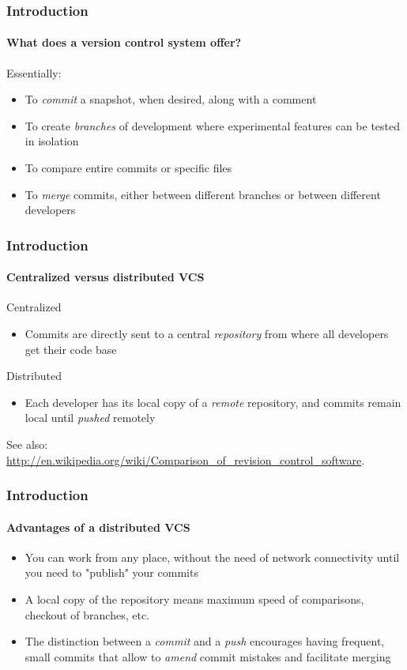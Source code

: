 \begin{frame}
\frametitle{Introduction}
\framesubtitle{What does a version control system offer?}

\begin{block}{Essentially:}
\begin{itemize}
\item To {\em commit} a snapshot, when desired, along with a comment 
\item To create {\em branches} of development where experimental features can be tested in isolation
\item To compare entire commits or specific files
\item To {\em merge} commits, either between different branches or between different developers
\end{itemize}
\end{block}

\end{frame}

\begin{frame}
\frametitle{Introduction}
\framesubtitle{Centralized versus distributed VCS}

\begin{block}{Centralized}
\begin{itemize}
\item Commits are directly sent to a central {\em repository} from where all developers get their code base
\end{itemize}
\end{block}

\begin{block}{Distributed}
\begin{itemize}
\item Each developer has its local copy of a {\em remote} repository, and commits remain local until {\em pushed} remotely
\end{itemize}
\end{block}

See also: \\  \url{http://en.wikipedia.org/wiki/Comparison_of_revision_control_software}.

\end{frame}

\begin{frame}
\frametitle{Introduction}
\framesubtitle{Advantages of a distributed VCS}

\begin{itemize}
\item You can work from any place, without the need of network connectivity until you need to "publish" your commits
\item A local copy of the repository means maximum speed of comparisons, checkout of branches, etc.
\item The distinction between a {\em commit} and a {\em push} encourages having frequent, small commits that allow to {\em amend} commit mistakes and facilitate merging
\end{itemize}

\end{frame}

